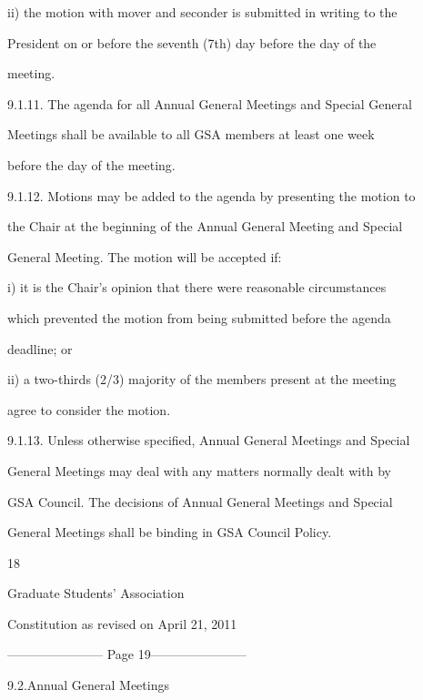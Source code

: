 \documentclass{article}
\begin{document}
ii)     the  motion  with  mover  and  seconder  is  submitted  in  writing  to  the  

President  on  or  before  the  seventh  (7th)  day  before  the  day  of  the  

meeting.  



9.1.11.     The agenda for all Annual General Meetings and Special General  

Meetings  shall  be  available  to  all  GSA  members  at  least  one  week  

before the day of the meeting.  



9.1.12.     Motions may be added to the agenda by  presenting the motion to  

the Chair at the beginning of the Annual General Meeting and Special  

General Meeting. The motion will be accepted if:  



i)      it  is  the  Chair's  opinion  that  there  were  reasonable  circumstances  

which prevented the motion  from  being  submitted before  the agenda  

deadline; or  



ii)     a  two-thirds  (2/3)  majority  of  the  members  present  at  the  meeting  

agree to consider the motion.  



9.1.13.     Unless otherwise specified, Annual General Meetings and Special  

General  Meetings may  deal  with  any  matters normally  dealt with  by  

GSA  Council. The decisions of Annual General Meetings and Special  

General Meetings shall be binding in GSA Council Policy.  



     18  



       Graduate Students’ Association  



  Constitution as revised on April 21, 2011  


----------------------- Page 19-----------------------

9.2.Annual General Meetings  
\end{document}
